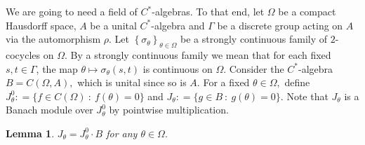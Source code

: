 \documentclass[a4paper,11pt,reqno]{amsart}
\theoremstyle{plain}
\newtheorem{lem}[thm]{Lemma}
\theoremstyle{mainthmstyle}
\theoremstyle{named}
\numberwithin{equation}{section}
\begin{document}
We are going to need a field of $C^{\ast}$-algebras. To that end, let $\Omega$ be a compact Hausdorff space, $A$ be a unital $C^{\ast}$-algebra and $\Gamma$ be a discrete group acting on $A$ via the  automorphism $\rho.$ Let $\left \{\sigma_{\theta} \right \}_{\theta \in \Omega}$ be a strongly continuous family of $2$-cocycles on $\Omega.$ By a strongly continuous family we mean that for each fixed $s,t\in\Gamma$, the map $\theta\mapsto\sigma_{\theta}(s,t)$ is continuous on $\Omega$. Consider the $C^{\ast}$-algebra $B = C (\Omega, A),$ which is unital since so is $A.$ For a fixed $\theta \in \Omega,$ define $J_{\theta}^{0} : = \{f \in C (\Omega)\ :\ f (\theta) = 0 \}$ and $J_{\theta} : = \{g \in B\ :\ g (\theta) = 0 \}.$ Note that $J_{\theta}$ is a Banach module over $J_{\theta}^{0}$ by pointwise multiplication.

\begin{lem} \label{C-H Equality}
$J_{\theta} = J_{\theta}^{0} \cdot B$ for any $\theta \in \Omega.$
\end{lem}
\end{document}
